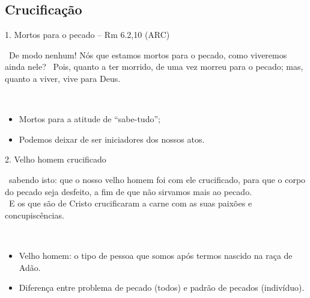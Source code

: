 \documentclass[12pt,aspectratio=169]{beamer}
\newcommand{\ver}[1]{%
    \raisebox{0.50ex}{%
        \scalebox{1.1}{%
            \pmb{\textbf{\textcolor{BSpbg}{#1}}}%
        }%
    }%
}
\newcommand{\QUOTE}[1]{%
    \par\noindent\hspace*{0.05\linewidth}%
    \begin{minipage}{0.9\linewidth}%
        \linespread{1.35}\large{#1}%
    \end{minipage}%
}
\newcommand{\YEL}[1]{{\textcolor{TXyel}{#1}}}
\newcommand{\BRI}[1]{{\textcolor{BSpbg}{#1}}}   %
\begin{document}
    \subsection{Crucificação}

    \begin{frame}{1. \YEL{Mortos para o pecado} -- Rm 6.2,10 (ARC)}
        \QUOTE{%
            \ver{2}~De modo nenhum! \YEL{Nós} que \YEL{estamos mortos para o pecado}, como
            viveremos ainda nele?
            \ver{10}~Pois, quanto a ter morrido, de uma vez \YEL{morreu para o pecado}; mas,
            quanto a viver, vive para Deus.
        }
        \\[1.5\bigskipamount]
        \begin{itemize}
            \item<2-> Mortos para a atitude de ``sabe-tudo'';
            \item<3-> Podemos deixar de ser iniciadores dos nossos atos.
        \end{itemize}
    \end{frame}

    \begin{frame}{2. \YEL{Velho homem crucificado}}
        \QUOTE{%
            \ver{Rm 6.6 (ARC)}~sabendo isto: que o nosso velho homem \YEL{foi com ele
            crucificado}, para que o corpo do pecado seja desfeito, a fim de que não sirvamos
            mais ao pecado.
            \\[\bigskipamount]
            \ver{Gl 5.24 (ARC)}~E os que são de Cristo \YEL{crucificaram a carne} com as suas
            paixões e concupiscências.
        }
        \\[1.5\bigskipamount]
        \begin{itemize}
            \item<2-> Velho homem: o \BRI{tipo de pessoa} que somos após termos nascido na raça
                de Adão.
            \item<3-> Diferença entre \BRI{problema} de pecado (todos) e \BRI{padrão} de pecados
                (indivíduo).
        \end{itemize}
    \end{frame}
\end{document}
